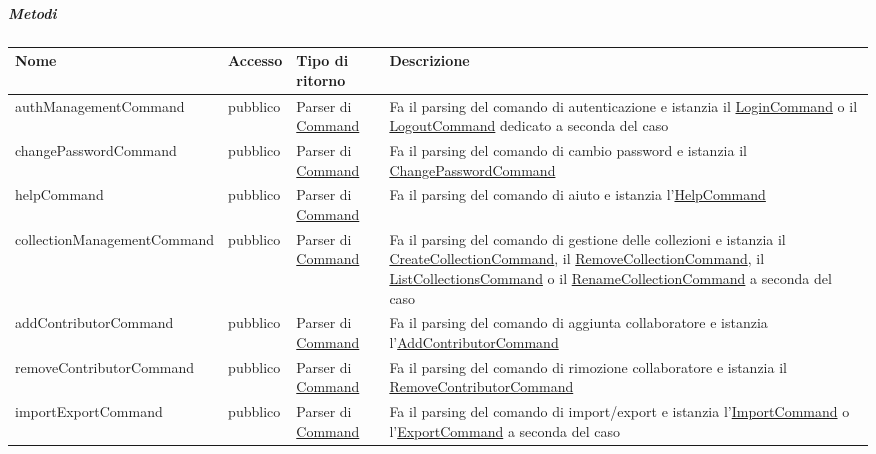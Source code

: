 \documentclass{scalatekids-article}
\begin{document}
\subparagraph{Metodi}

\begin{longtable}{| p{5.5cm} | p{1.5cm} | p{2cm} | p{7.5cm} |}
  \hline
  Nome & Accesso & Tipo di ritorno & Descrizione\\
  \hline
  authManagementCommand & pubblico & Parser di \hyperref[sec:actorbase::cli::models::Command]{Command} & Fa il parsing del comando di autenticazione e istanzia il \hyperref[sec:actorbase::cli::models::LoginCommand]{LoginCommand} o il \hyperref[sec:actorbase::cli::models::LogoutCommand]{LogoutCommand} dedicato a seconda del caso\\
  \hline
  changePasswordCommand & pubblico & Parser di \hyperref[sec:actorbase::cli::models::Command]{Command} & Fa il parsing del comando di cambio password e istanzia il \hyperref[sec:actorbase::cli::models::ChangePasswordCommand]{ChangePasswordCommand}\\
  \hline
  helpCommand & pubblico & Parser di \hyperref[sec:actorbase::cli::models::Command]{Command} & Fa il parsing del comando di aiuto e istanzia l'\hyperref[sec:actorbase::cli::models::HelpCommand]{HelpCommand}\\
  \hline
  collectionManagementCommand & pubblico & Parser di \hyperref[sec:actorbase::cli::models::Command]{Command} & Fa il parsing del comando di gestione delle collezioni e istanzia il \hyperref[sec:actorbase::cli::models::CreateCollectionCommand]{CreateCollectionCommand}, il \hyperref[sec:actorbase::cli::models::RemoveCollectionCommand]{RemoveCollectionCommand}, il \hyperref[sec:actorbase::cli::models::ListCollectionsCommand]{ListCollectionsCommand} o il \hyperref[sec:actorbase::cli::models::RenameCollectionCommand]{RenameCollectionCommand} a seconda del caso\\
  \hline
  addContributorCommand & pubblico & Parser di \hyperref[sec:actorbase::cli::models::Command]{Command} & Fa il parsing del comando di aggiunta collaboratore e istanzia l'\hyperref[sec:actorbase::cli::models::AddContributorCommand]{AddContributorCommand}\\
  \hline
  removeContributorCommand & pubblico & Parser di \hyperref[sec:actorbase::cli::models::Command]{Command} & Fa il parsing del comando di rimozione collaboratore e istanzia il \hyperref[sec:actorbase::cli::models::RemoveContributorCommand]{RemoveContributorCommand}\\
  \hline
  importExportCommand & pubblico & Parser di \hyperref[sec:actorbase::cli::models::Command]{Command} & Fa il parsing del comando di import/export e istanzia l'\hyperref[sec:actorbase::cli::models::ImportCommand]{ImportCommand} o l'\hyperref[sec:actorbase::cli::models::ExportCommand]{ExportCommand} a seconda del caso\\

\end{longtable}
\end{document}
